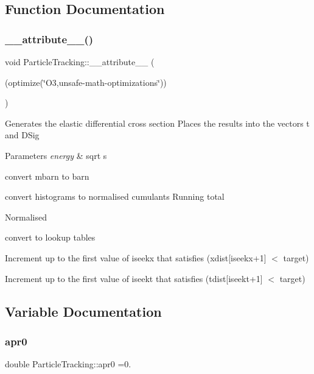 \subsection{Function Documentation}
\mbox{\label{namespaceParticleTracking_a1064dfa4c548a311ce007c08f0f3a17b}} 
\subsubsection{\texorpdfstring{\+\_\+\+\_\+attribute\+\_\+\+\_\+()}{\_\_attribute\_\_()}}
{\footnotesize\ttfamily void Particle\+Tracking\+::\+\_\+\+\_\+attribute\+\_\+\+\_\+ (\begin{DoxyParamCaption}\item[{(optimize(\char`\"{}O3,unsafe-\/math-\/optimizations\char`\"{}))}]{ }\end{DoxyParamCaption})}

Generates the elastic differential cross section Places the results into the vectors t and D\+Sig 
\begin{DoxyParams}{Parameters}
{\em energy} & sqrt s \\
\hline
\end{DoxyParams}
convert mbarn to barn

convert histograms to normalised cumulants Running total

Normalised

convert to lookup tables

Increment up to the first value of iseekx that satisfies (xdist\mbox{[}iseekx+1\mbox{]} $<$ target)

Increment up to the first value of iseekt that satisfies (tdist\mbox{[}iseekt+1\mbox{]} $<$ target) 

\subsection{Variable Documentation}
\mbox{\label{namespaceParticleTracking_af89aac299c3f942237a89b0a2d76271d}} 
\subsubsection{\texorpdfstring{apr0}{apr0}}
{\footnotesize\ttfamily double Particle\+Tracking\+::apr0 =0.}

